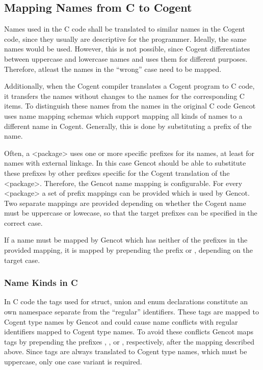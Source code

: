 \subsection{Mapping Names from C to Cogent}
\label{design-names}

Names used in the C code shall be translated to similar names in the Cogent code, since they usually are descriptive for the
programmer. Ideally, the same names would be used. However, this is not possible, since Cogent differentiates between 
uppercase and lowercase names and uses them for different purposes. Therefore, atleast the names in the ``wrong'' case
need to be mapped.

Additionally, when the Cogent compiler translates a Cogent program to C code, it transfers the names without changes to
the names for the corresponding C items. To distinguish these names from the names in the original C code Gencot uses 
name mapping schemas which support mapping all kinds of names to a different name in Cogent. Generally, this is done by 
substituting a prefix of the name.

Often, a <package> uses one or more specific prefixes for its names, at least for names with external linkage. In this case
Gencot should be able to substitute these prefixes by other prefixes specific for the Cogent translation of the <package>.
Therefore, the Gencot name mapping is configurable. For every <package> a set of prefix mappings can be provided which is
used by Gencot. Two separate mappings are provided depending on whether the Cogent name must be uppercase or lowecase, so 
that the target prefixes can be specified in the correct case.

If a name must be mapped by Gencot which has neither of the prefixes in the provided mapping, it is mapped 
by prepending the prefix  or , depending on the target case.

\subsubsection{Name Kinds in C}

In C code the tags used for struct, union and enum declarations constitute an own namespace separate from the ``regular''
identifiers. These tags are mapped to Cogent type names by Gencot and could cause name conflicts with regular identifiers
mapped to Cogent type names. To avoid these conflicts Gencot maps tags by prepending the prefixes , 
, or , respectively, after the mapping described above. Since tags are always translated to Cogent 
type names, which must be uppercase, only one case variant is required.

